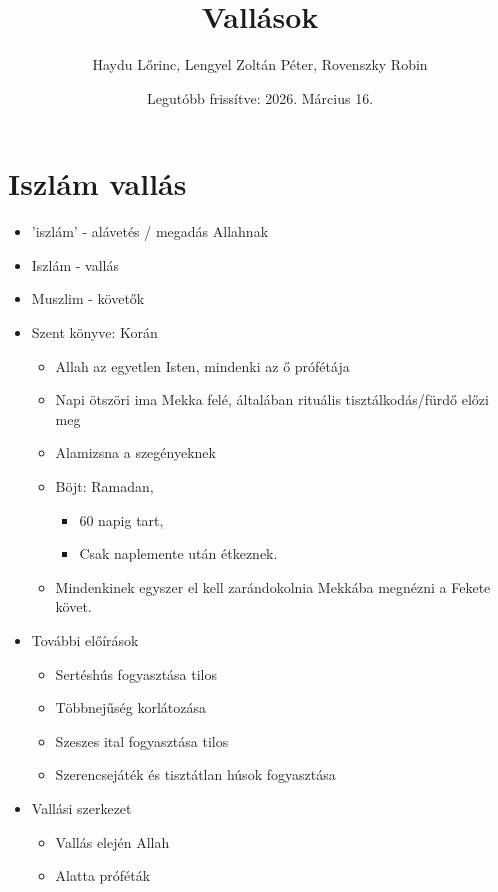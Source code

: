 \documentclass{article}
\title{Vallások}
\author{Haydu Lőrinc, Lengyel Zoltán Péter, Rovenszky Robin}
\date{Legutóbb frissítve: 2026. Március 16.}
\begin{document}
\maketitle
\tableofcontents
\newpage

\section{Iszlám vallás}
\begin{itemize}

    \item 'iszlám' - alávetés / megadás Allahnak
    \item Iszlám - vallás
    \item Muszlim - követők
    
    \item Szent könyve: Korán
    \begin{itemize}
    
        \item Allah az egyetlen Isten, mindenki az ő prófétája
        \item Napi ötszöri ima Mekka felé, általában rituális tisztálkodás/fürdő előzi meg
        \item Alamizsna a szegényeknek
        
        \item Böjt: Ramadan,
        \begin{itemize}
            \item 60 napig tart,
            \item Csak naplemente után étkeznek.
        \end{itemize}
        
        \item Mindenkinek egyszer el kell zarándokolnia Mekkába megnézni a Fekete követ.
        
    \end{itemize}
    
    \item További előírások 
    \begin{itemize}
        \item Sertéshús fogyasztása tilos
        \item Többnejűség korlátozása
        \item Szeszes ital fogyasztása tilos
        \item Szerencsejáték és tisztátlan húsok fogyasztása
    \end{itemize}
    
    \item Vallási szerkezet 
    \begin{itemize}
        \item Vallás elején Allah 
        \item Alatta próféták 
        

\end{itemize}
\end{itemize}
\end{document}
